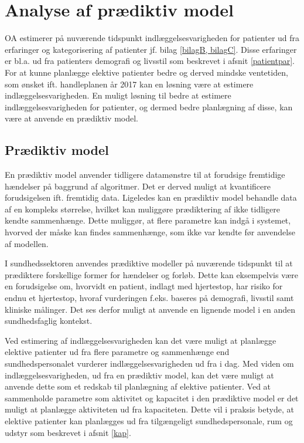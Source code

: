 \chapter{Analyse af prædiktiv model}
OA estimerer på nuværende tidspunkt indlæggelsesvarigheden for patienter ud fra erfaringer og kategorisering af patienter jf. bilag \ref{bilagB, bilagC}. Disse erfaringer er bl.a. ud fra patienters demografi og livsstil som beskrevet i afsnit \ref{patientpar}. For at kunne planlægge elektive patienter bedre og derved mindske ventetiden, som ønsket ift. handleplanen år 2017 kan en løsning være at estimere indlæggelsesvarigheden. En muligt løsning til bedre at estimere indlæggelsesvarigheden for patienter, og dermed bedre planlægning af disse, kan være at anvende en prædiktiv model. 


\section{Prædiktiv model} \label{praemodel}
En prædiktiv model anvender tidligere datamønstre til at forudsige fremtidige hændelser på baggrund af algoritmer. Det er derved muligt at kvantificere forudsigelsen ift. fremtidig data. Ligeledes kan en prædiktiv model behandle data af en kompleks størrelse, hvilket kan muliggøre prædiktering af ikke tidligere kendte sammenhænge. Dette muliggør, at flere parametre kan indgå i systemet, hvorved der måske kan findes sammenhænge, som ikke var kendte før anvendelse af modellen.\cite{Kuhn2013}


I sundhedssektoren anvendes prædiktive modeller på nuværende tidspunkt til at prædiktere forskellige former for hændelser og forløb. Dette kan eksempelvis være en forudsigelse om, hvorvidt en patient, indlagt med hjertestop, har risiko for endnu et hjertestop, hvoraf vurderingen f.eks. baseres på demografi, livsstil samt kliniske målinger\cite{Hastie2008}. Det ses derfor muligt at anvende en lignende model i en anden sundhedsfaglig kontekst.


Ved estimering af indlæggelsesvarigheden kan det være muligt at planlægge elektive patienter ud fra flere parametre og sammenhænge end sundhedspersonalet vurderer indlæggelsesvarigheden ud fra i dag. Med viden om indlæggelsesvarigheden, ud fra en prædiktiv model, kan det være muligt at anvende dette som et redskab til planlægning af elektive patienter. Ved at sammenholde parametre som aktivitet og kapacitet i den prædiktive model er det muligt at planlægge aktiviteten ud fra kapaciteten. Dette vil i praksis betyde, at elektive patienter kan planlægges ud fra tilgængeligt sundhedspersonale, rum og udstyr som beskrevet i afsnit \ref{kap}. 


